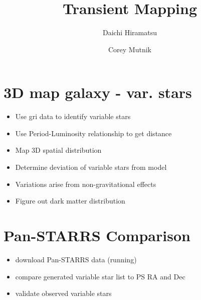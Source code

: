 \documentclass[aps,prl,twocolumn,superscriptaddress]{revtex4-1}
\begin{document}
\title{Transient Mapping}


\author{Daichi Hiramatsu}
\author{Corey Mutnik}



\begin{abstract}

\end{abstract}

\maketitle    


\section{}


\section{3D map galaxy - var. stars}

\begin{itemize}
	\item{} Use gri data to identify variable stars
	\item{} Use Period-Luminosity relationship to get distance
	\item{} Map 3D spatial distribution
	\item{} Determine deviation of variable stars from model
	\item{} Variations arise from non-gravitational effects
	\item{} Figure out dark matter distribution
\end{itemize}

\section{Pan-STARRS Comparison}
\begin{itemize}
	\item{} download Pan-STARRS data (running)
	\item{} compare generated variable star list to PS RA and Dec
	\item{} validate observed variable stars
\end{itemize}
\end{document}
